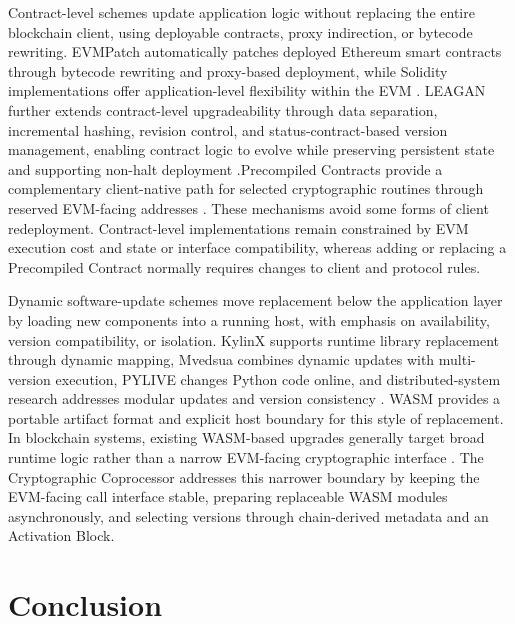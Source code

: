 \documentclass[pdflatex,sn-mathphys-num]{sn-jnl}%
\theoremstyle{thmstyleone}%
\theoremstyle{thmstyletwo}%
\theoremstyle{thmstylethree}%
\begin{document}
Contract-level schemes update application logic without replacing the entire blockchain client, using deployable contracts, proxy indirection, or bytecode rewriting. EVMPatch automatically patches deployed Ethereum smart contracts through bytecode rewriting and proxy-based deployment, while Solidity implementations offer application-level flexibility within the EVM \cite{rodler2021evmpatch,ethereumEVM}. LEAGAN further extends contract-level upgradeability through data separation, incremental hashing, revision control, and status-contract-based version management, enabling contract logic to evolve while preserving persistent state and supporting non-halt deployment \cite{kumar2025leagan}.Precompiled Contracts provide a complementary client-native path for selected cryptographic routines through reserved EVM-facing addresses \cite{evmCodesPrecompiled,eip196,eip197}. These mechanisms avoid some forms of client redeployment. Contract-level implementations remain constrained by EVM execution cost and state or interface compatibility, whereas adding or replacing a Precompiled Contract normally requires changes to client and protocol rules.



Dynamic software-update schemes move replacement below the application layer by loading new components into a running host, with emphasis on availability, version compatibility, or isolation. KylinX supports runtime library replacement through dynamic mapping, Mvedsua combines dynamic updates with multi-version execution, PYLIVE changes Python code online, and distributed-system research addresses modular updates and version consistency \cite{zhang2018kylinx,pina2019mvedsua,huang2021pylive,ajmani2006modular,baresi2017versionConsistency}. WASM provides a portable artifact format and explicit host boundary for this style of replacement. In blockchain systems, existing WASM-based upgrades generally target broad runtime logic rather than a narrow EVM-facing cryptographic interface \cite{webassemblyCoreSpec,polkadotRuntimeUpgrades}. The Cryptographic Coprocessor addresses this narrower boundary by keeping the EVM-facing call interface stable, preparing replaceable WASM modules asynchronously, and selecting versions through chain-derived metadata and an Activation Block.

\section{Conclusion}\label{sec7}
\end{document}
